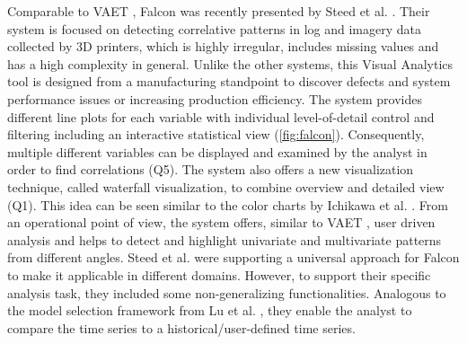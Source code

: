 \documentclass[electronic]{vgtc}             %
\begin{document}
Comparable to VAET \cite{Xie:2014}, Falcon was recently presented by Steed et al. \cite{steed:2017}.
Their system is focused on detecting correlative patterns in log and imagery data collected by 3D printers, which is highly irregular, includes missing values and has a high complexity in general.
Unlike the other systems, this Visual Analytics tool is designed from a manufacturing standpoint to discover defects and system performance issues or increasing production efficiency.
The system provides different line plots for each variable with individual level-of-detail control and filtering including an interactive statistical view (\autoref{fig:falcon}).
Consequently, multiple different variables can be displayed and examined by the analyst in order to find correlations (Q5).
The system also offers a new visualization technique, called waterfall visualization, to combine overview and detailed view (Q1). 
This idea can be seen similar to the color charts by Ichikawa et al. \cite{ichikawa:2002}.
From an operational point of view, the system offers, similar to VAET \cite{Xie:2014}, user driven analysis and helps to detect and highlight univariate and multivariate patterns from different angles.
Steed et al. were supporting a universal approach for Falcon to make it applicable in different domains. 
However, to support their specific analysis task, they included some non-generalizing functionalities. 
Analogous to the model selection framework from Lu et al. \cite{lu:2014}, they enable the analyst to compare the time series to a historical/user-defined time series. 
\end{document}
